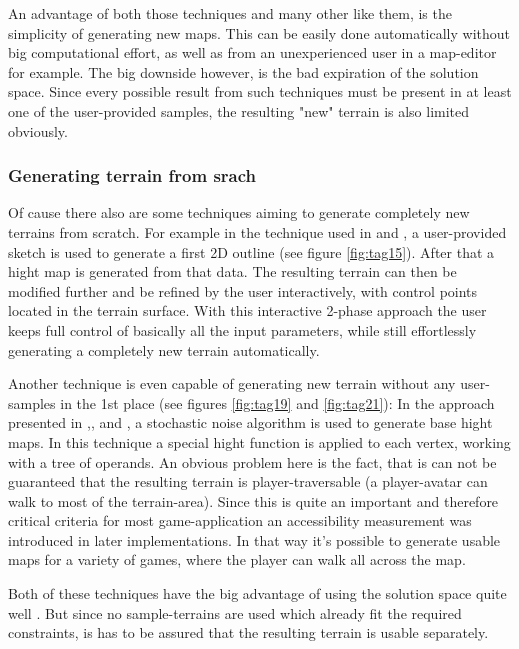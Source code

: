An advantage of both those techniques and many other like them, is the simplicity of generating new maps. This can be easily done automatically without big computational effort, as well as from an unexperienced user in a map-editor for example. The big downside however, is the bad expiration of the solution space. Since every possible result from such techniques must be present in at least one of the user-provided samples, the resulting "new" terrain is also limited obviously.

\subsubsection{Generating terrain from srach}
Of cause there also are some techniques aiming to generate completely new terrains from scratch. For example in the technique used in \cite{ong2005terrain} and \cite{saunders2006realistic}, a user-provided sketch is used to generate a first 2D outline (see figure \ref{fig:tag15}). After that a hight map is generated from that data. The resulting terrain can then be modified further and be refined by the user interactively, with control points located in the terrain surface. With this interactive 2-phase approach the user keeps full control of basically all the input parameters, while still effortlessly generating a completely new terrain automatically.

Another technique is even capable of generating new terrain without any user-samples in the 1st place (see figures \ref{fig:tag19} and \ref{fig:tag21}): In the approach presented in \cite{frade2009breeding},\cite{frade2010evolution1},\cite{frade2010evolution2} and \cite{rodrigues2010development}, a stochastic noise algorithm is used to generate base hight maps. In this technique a special hight function is applied to each vertex, working with a tree of operands. An obvious problem here is the fact, that is can not be guaranteed that the resulting terrain is player-traversable (a player-avatar can walk to most of the terrain-area). Since this is quite an important and therefore critical criteria for most game-application an accessibility measurement was introduced in later implementations. In that way it's possible to generate usable maps for a variety of games, where the player can walk all across the map.

Both of these techniques have the big advantage of using the solution space quite well \cite{raffe2012survey}. But since no sample-terrains are used which already fit the required constraints, is has to be assured that the resulting terrain is usable separately.

